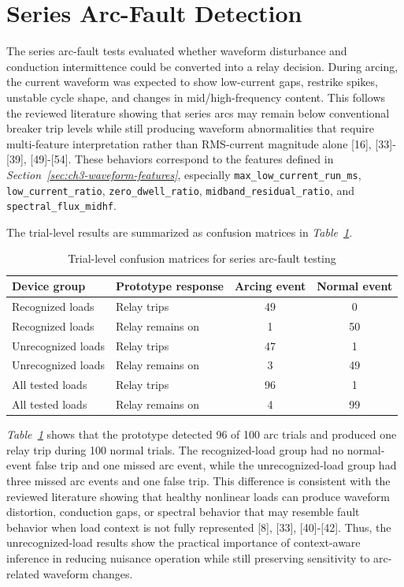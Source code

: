 \section{Series Arc-Fault Detection}
\label{sec:ch4-series-arc-detection}

The series arc-fault tests evaluated whether waveform disturbance and conduction
intermittence could be converted into a relay decision. During arcing, the
current waveform was expected to show low-current gaps, restrike spikes,
unstable cycle shape, and changes in mid/high-frequency content. This follows
the reviewed literature showing that series arcs may remain below conventional
breaker trip levels while still producing waveform abnormalities that require
multi-feature interpretation rather than RMS-current magnitude alone [16],
[33]-[39], [49]-[54]. These behaviors correspond to the features defined in
\textit{Section~\ref{sec:ch3-waveform-features}}, especially
\texttt{max\_low\_current\_run\_ms}, \texttt{low\_current\_ratio},
\texttt{zero\_dwell\_ratio}, \texttt{midband\_residual\_ratio}, and
\texttt{spectral\_flux\_midhf}.

The trial-level results are summarized as confusion matrices in
\textit{Table~\ref{tab:ch4-arc-confusion}}. 

\begin{table}[H]
  \centering
  \caption{Trial-level confusion matrices for series arc-fault testing}
  \label{tab:ch4-arc-confusion}
  \begin{tabular}{p{}p{}cc}
    \toprule
    \textbf{Device group} & \textbf{Prototype response} & \textbf{Arcing event} & \textbf{Normal event} \\
    \midrule
    Recognized loads & Relay trips & 49 & 0 \\
    Recognized loads & Relay remains on & 1 & 50 \\
    \midrule
    Unrecognized loads & Relay trips & 47 & 1 \\
    Unrecognized loads & Relay remains on & 3 & 49 \\
    \midrule
    All tested loads & Relay trips & 96 & 1 \\
    All tested loads & Relay remains on & 4 & 99 \\
    \bottomrule
  \end{tabular}
\end{table}

\textit{Table~\ref{tab:ch4-arc-confusion}} shows that the prototype detected
96 of 100 arc trials and produced one relay trip during 100 normal trials. The
recognized-load group had no normal-event false trip and one missed arc event,
while the unrecognized-load group had three missed arc events and one false
trip. This difference is consistent with the reviewed literature showing that
healthy nonlinear loads can produce waveform distortion, conduction gaps, or
spectral behavior that may resemble fault behavior when load context is not
fully represented [8], [33], [40]-[42]. Thus, the unrecognized-load results
show the practical importance of context-aware inference in reducing nuisance
operation while still preserving sensitivity to arc-related waveform changes.

